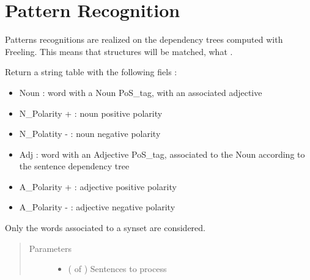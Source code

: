 \documentclass[letterpaper,10pt,english]{sphinxmanual}
\begin{document}
\section{Pattern Recognition}
\label{\detokenize{analysis:module-loacore.analysis.pattern_recognition}}\label{\detokenize{analysis:pattern-recognition}}
Patterns recognitions are realized on the dependency trees computed with Freeling. This means that 
structures will be matched, what .

\begin{fulllineitems}
\label{\detokenize{analysis:loacore.analysis.pattern_recognition.adj_pattern_table}}
Return a string table with the following fiels :
\begin{itemize}
\item {} 
Noun : word with a Noun PoS\_tag, with an associated adjective

\item {} 
N\_Polarity + : noun positive polarity

\item {} 
N\_Polatity - : noun negative polarity

\item {} 
Adj : word with an Adjective PoS\_tag, associated to the Noun according to the sentence dependency tree

\item {} 
A\_Polarity + : adjective positive polarity

\item {} 
A\_Polarity - : adjective negative polarity

\end{itemize}

Only the words associated to a synset are considered.
\begin{quote}\begin{description}
\item[{Parameters}] \leavevmode\begin{itemize}
\item {} 
 ( of ) \textendash{} Sentences to process


\end{itemize}
\end{description}
\end{quote}
\end{fulllineitems}
\end{document}
